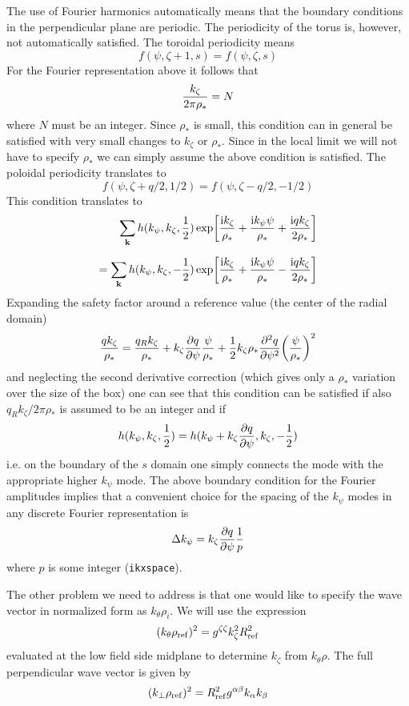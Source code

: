 \documentclass{report}
\def\be{\begin{equation}}
\def\ee{\end{equation}}
\def\bee{\begin{eqnarray}}
\def\eee{\end{eqnarray}}
\begin{document}
The use of Fourier harmonics automatically means that the boundary conditions in the perpendicular 
plane are periodic.  The periodicity of the torus is, however, not automatically satisfied. The 
toroidal periodicity means 
\be 
f(\psi,\zeta+ 1,s) = f(\psi,\zeta,s) 
\ee
For the Fourier representation above it follows that 
\be  
{k_\zeta \over 2 \pi \rho_*} = N 
\ee
where $N$ must be an integer. Since $\rho_*$ is small, this condition can in general be satisfied 
with very small changes to $k_\zeta$ or $\rho_*$. Since in the local limit we will not have to 
specify $\rho_*$ we can simply assume the above condition is satisfied. 
The poloidal periodicity translates to
\be 
f(\psi,\zeta + q/2, 1/2) = f(\psi,\zeta- q/2,-1/2)
\ee
This condition translates to 
\bee 
\sum_{\bf k} h( k_\psi, k_\zeta, {1 \over 2} ) \exp \biggl [ {{\rm i} k_\zeta \over \rho_*} + {{\rm i} k_\psi 
\psi \over \rho_*} + {{\rm i} q k_\zeta \over 2 \rho_*} \biggr ] \cr 
\noalign{\vskip 0.2 truecm} 
= \sum_{\bf k} h ( k_\psi, k_\zeta, - {1 \over 2} )
 \exp \biggl [ {{\rm i} k_\zeta \over \rho_*} + {{\rm i} k_\psi 
\psi \over \rho_*} - {{\rm i} q k_\zeta \over 2 \rho_*} \biggr ]
\eee
Expanding the safety factor around a reference value (the center of the radial domain) 
\be 
{q k_\zeta \over \rho_*} = {q_R k_\zeta \over \rho_*} + k_\zeta {\partial q \over \partial \psi}{\psi \over \rho_*} 
+ {1 \over 2} k_\zeta \rho_* {\partial^2 q \over \partial \psi^2} \biggl ( {\psi \over \rho_*} \biggr )^2 
\ee
and neglecting the second derivative correction (which gives only a $\rho_*$ variation over the size of the 
box) one can see that this condition can be satisfied if also $q_R k_\zeta / 2 \pi \rho_*$ is assumed to be an 
integer and if 
\be 
h(k_\psi, k_\zeta, {1\over 2} ) = h( k_\psi + k_\zeta {\partial q \over \partial \psi} , k_\zeta, -{1 \over 2} ) 
\ee
i.e. on the boundary of the $s$ domain one simply connects the mode with the appropriate higher $k_\psi$ mode. 
The above boundary condition for the Fourier amplitudes implies that a convenient choice for the spacing of 
the $k_\psi$ modes in any discrete Fourier representation is 
\be 
\Delta k_\psi = k_\zeta {\partial q \over \partial \psi} {1 \over p}
\ee
where $p $ is some integer (\texttt{ikxspace}). \label{ikxspace}


The other problem we need to address is that one would like to specify the wave vector in normalized 
form as $k_\theta \rho_i$. We will use the expression 
\be 
(k_\theta \rho_{\rm ref} )^2 = g^{\zeta \zeta} k_\zeta^2 R_{\rm ref}^2
\ee
evaluated at the low field side midplane to determine $k_\zeta$ from $k_\theta \rho$.   
The full perpendicular wave vector is given by 
\be 
(k_\perp \rho_{\rm ref} )^2 = R_{\rm ref}^2 g^{\alpha \beta} k_\alpha k_\beta 
\ee 
\end{document}
